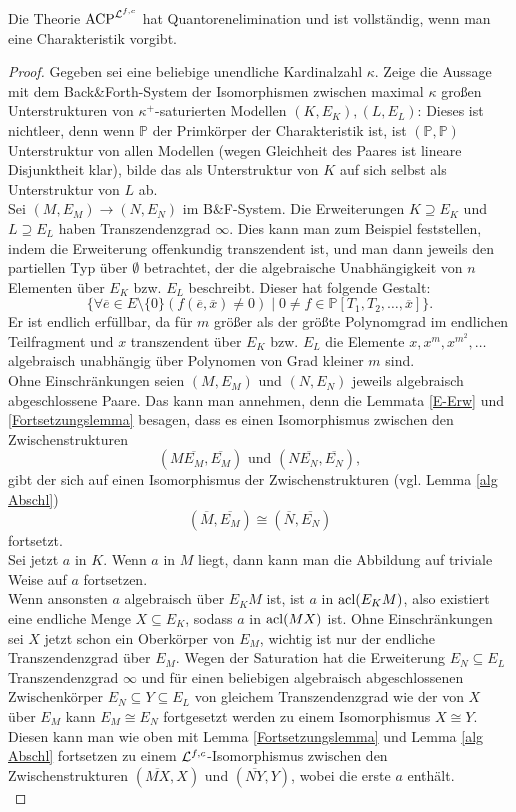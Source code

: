     \begin{theorem}\label{QE}
    	Die Theorie $\operatorname{ACP}^{\mathcal{L}^{f,c}}$ hat Quantorenelimination und ist vollständig, wenn man eine Charakteristik vorgibt.
    \end{theorem}
    \begin{proof}
    	Gegeben sei eine beliebige unendliche Kardinalzahl $\kappa$.
    	Zeige die Aussage mit dem Back\&Forth-System der Isomorphismen zwischen maximal $\kappa$ großen Unterstrukturen von $\kappa^+$-saturierten Modellen $(K,E_K),(L,E_L)$:
    	Dieses ist nichtleer, denn wenn $\mathbb{P}$ der Primkörper der Charakteristik ist, ist $(\mathbb{P},\mathbb{P})$ Unterstruktur von allen Modellen (wegen Gleichheit des Paares ist lineare Disjunktheit klar), bilde das als Unterstruktur von $K$ auf sich selbst als Unterstruktur von $L$ ab.\\
    	Sei $(M,E_M)\rightarrow(N,E_N)$ im B\&F-System. Die Erweiterungen $K\supseteq E_K$ und $L\supseteq E_L$ haben Transzendenzgrad $\infty$. Dies kann man zum Beispiel feststellen, indem die Erweiterung offenkundig transzendent ist, und man dann jeweils den partiellen Typ über $\emptyset$ betrachtet, der die algebraische Unabhängigkeit von $n$ Elementen über $E_K$ bzw. $E_L$ beschreibt. Dieser hat folgende Gestalt:
    	$$\{\forall \overline{e}\in E\setminus\{0\}(f(\overline{e},\overline{x})\neq0)\mid 0\neq f\in\mathbb{P}[T_1,T_2,\dots,\overline{x}]\}.$$
    	Er ist endlich erfüllbar, da für $m$ größer als der größte Polynomgrad im endlichen Teilfragment und $x$ transzendent über $E_K$ bzw. $E_L$ die Elemente $x,x^m,x^{m^2},\dots$ algebraisch unabhängig über Polynomen von Grad kleiner $m$ sind.\\
    	Ohne Einschränkungen seien $(M,E_M)$ und $(N,E_N)$ jeweils algebraisch abgeschlossene Paare. Das kann man annehmen, denn die Lemmata \ref{E-Erw} und \ref{Fortsetzungslemma} besagen, dass es einen Isomorphismus zwischen den Zwischenstrukturen $$(M\overline{E_M},\overline{E_M})\text{ und }(N\overline{E_N},\overline{E_N}),$$ gibt der sich auf einen Isomorphismus der Zwischenstrukturen (vgl. Lemma \ref{alg Abschl}) $$(\overline{M},\overline{E_M})\cong(\overline{N},\overline{E_N})$$ fortsetzt.\\
    	Sei jetzt $a$ in $K$. Wenn $a$ in $M$ liegt, dann kann man die Abbildung auf triviale Weise auf $a$ fortsetzen.\\
    	Wenn ansonsten $a$ algebraisch über $E_KM$ ist, ist $a$ in $\operatorname{acl}(E_KM)$, also existiert eine endliche Menge $X\subseteq E_K$, sodass $a$ in $\operatorname{acl}(MX)$ ist. Ohne Einschränkungen sei $X$ jetzt schon ein Oberkörper von $E_M$, wichtig ist nur der endliche Transzendenzgrad über $E_M$. Wegen der Saturation hat die Erweiterung $E_N\subseteq E_L$ Transzendenzgrad $\infty$ und für einen beliebigen algebraisch abgeschlossenen Zwischenkörper $E_N\subseteq Y\subseteq E_L$ von gleichem Transzendenzgrad wie der von $X$ über $E_M$ kann $E_M\cong E_N$ fortgesetzt werden zu einem Isomorphismus $X\cong Y$. Diesen kann man wie oben mit Lemma \ref{Fortsetzungslemma} und Lemma \ref{alg Abschl} fortsetzen zu einem $\mathcal{L}^{f,c}$-Isomorphismus zwischen den Zwischenstrukturen $(\overline{MX},X)$ und $(\overline{NY},Y)$, wobei die erste $a$ enthält.\\

\end{proof}
